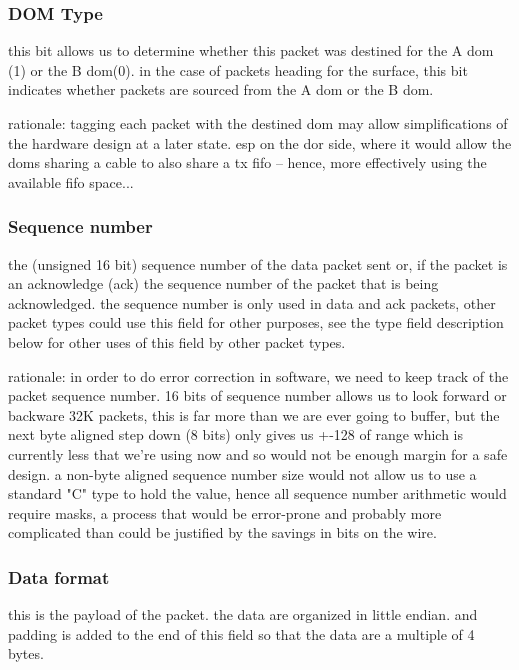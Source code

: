 \documentclass[11pt]{article}
\begin{document}
\hypertarget{dom-type}{\subsubsection{DOM Type}}

  this bit allows us to determine whether this packet 
  was destined for the A dom (1) or the B dom(0).  in the 
  case of packets heading for the surface, this bit indicates 
  whether packets are sourced from the A dom or the B dom.

  rationale: tagging each packet with the destined
  dom may allow simplifications of the hardware
  design at a later state.  esp on the dor side,
  where it would allow the doms sharing a cable to also
  share a tx fifo -- hence, more effectively using
  the available fifo space...

\hypertarget{sequence-number}{\subsubsection{Sequence number}}

the (unsigned 16 bit) sequence number of the 
data packet sent or, if the packet is an acknowledge 
(ack) the sequence number of the packet that is
being acknowledged.  the sequence number is only
used in data and ack packets, other packet types
could use this field for other purposes, see
the type field description below for other uses
of this field by other packet types.

rationale: in order to do error correction in software, 
we need to keep track of the packet sequence number.
16 bits of sequence number allows us to look
forward or backware 32K packets, this is
far more than we are ever going to buffer, 
but the next byte aligned step down (8 bits)
only gives us +-128 of range which is currently
less that we're using now and so would not be
enough margin for a safe design.  a non-byte
aligned sequence number size would not allow
us to use a standard "C" type to hold the
value, hence all sequence number arithmetic
would require masks, a process that would be
error-prone and probably more complicated than
could be justified by the savings in bits
on the wire.

\hypertarget{data-format}{\subsubsection{Data format}}

  this is the payload of the packet.  the data are organized in
  little endian.  and padding is added to the end of this field
  so that the data are a multiple of 4 bytes.
\end{document}
